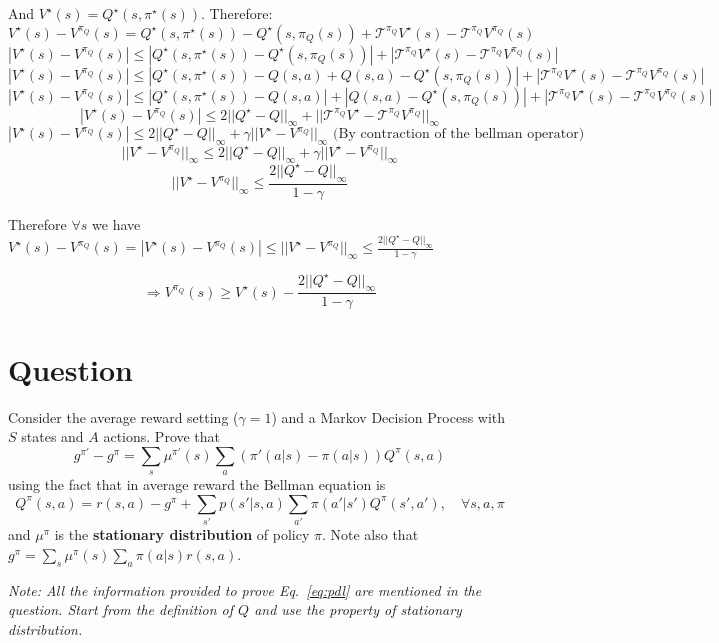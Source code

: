 \documentclass[a4paper]{article}
\begin{document}
And $V^\star(s) = Q^\star(s, \pi^\star(s))$. Therefore:
$$V^\star(s)-V^{\pi_{Q}}(s) = Q^\star(s, \pi^\star(s)) - Q^\star(s, \pi_Q(s)) + \mathcal{T}^{\pi_{Q}}V^{\star}(s) - \mathcal{T}^{\pi_{Q}}V^{\pi_{Q}}(s)$$
$$|V^\star(s)-V^{\pi_{Q}}(s)| \le |Q^\star(s, \pi^\star(s)) - Q^\star(s, \pi_Q(s))| + |\mathcal{T}^{\pi_{Q}}V^{\star}(s) - \mathcal{T}^{\pi_{Q}}V^{\pi_{Q}}(s)|$$
$$|V^\star(s)-V^{\pi_{Q}}(s)| \le |Q^\star(s, \pi^\star(s)) - Q(s, a) + Q(s, a) - Q^\star(s, \pi_Q(s))| + |\mathcal{T}^{\pi_{Q}}V^{\star}(s) - \mathcal{T}^{\pi_{Q}}V^{\pi_{Q}}(s)|$$
$$|V^\star(s)-V^{\pi_{Q}}(s)| \le |Q^\star(s, \pi^\star(s)) - Q(s, a)| + |Q(s, a) - Q^\star(s, \pi_Q(s))| + |\mathcal{T}^{\pi_{Q}}V^{\star}(s) - \mathcal{T}^{\pi_{Q}}V^{\pi_{Q}}(s)|$$
$$|V^\star(s)-V^{\pi_{Q}}(s)| \le 2||Q^\star - Q||_\infty + ||\mathcal{T}^{\pi_{Q}}V^{\star} - \mathcal{T}^{\pi_{Q}}V^{\pi_{Q}}||_\infty$$
$$|V^\star(s)-V^{\pi_{Q}}(s)| \le 2||Q^\star - Q||_\infty + \gamma||V^{\star} - V^{\pi_{Q}}||_\infty\text{     (By contraction of the bellman operator)}$$
$$||V^{\star} - V^{\pi_{Q}}||_\infty \le 2||Q^\star - Q||_\infty + \gamma||V^{\star} - V^{\pi_{Q}}||_\infty$$
$$||V^{\star} - V^{\pi_{Q}}||_\infty \le \frac{2||Q^\star - Q||_\infty}{1-\gamma}$$

Therefore $\forall s$ we have $V^{\star}(s) - V^{\pi_{Q}}(s) = |V^{\star}(s) - V^{\pi_{Q}}(s)| \le ||V^{\star} - V^{\pi_{Q}}||_\infty \le \frac{2||Q^\star - Q||_\infty}{1-\gamma}$

$$\Rightarrow V^{\pi_{Q}}(s) \ge V^{\star}(s) - \frac{2||Q^\star - Q||_\infty}{1-\gamma}$$

\section{Question}
Consider the average reward setting ($\gamma = 1$) and a Markov Decision Process with $S$ states and $A$ actions. Prove that
\begin{equation}\label{eq:pdl}
    g^{\pi'} - g^{\pi} = \sum_s \mu^{\pi'}(s) \sum_a (\pi'(a|s) - \pi(a|s)) Q^\pi(s,a)
\end{equation}
using the fact that in average reward the Bellman equation is
\[
    Q^{\pi}(s,a) = r(s,a) - g^\pi + \sum_{s'} p(s'|s,a) \sum_{a'} \pi(a'|s') Q^\pi(s', a'), \quad \forall s,a, \pi
\]
and $\mu^\pi$ is the \textbf{stationary distribution} of policy $\pi$. Note also that $g^\pi = \sum_s \mu^\pi(s) \sum_a \pi(a|s) r(s,a)$.

\vspace{.1in}
\emph{Note: All the information provided to prove Eq.~\ref{eq:pdl} are mentioned in the question. Start from the definition of $Q$ and use the property of stationary distribution.}
\end{document}
